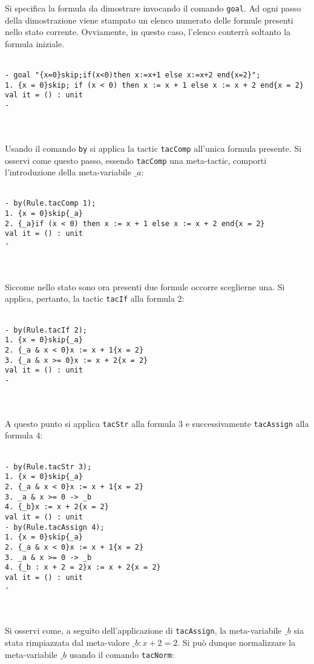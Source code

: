 \documentclass[]{article}
\begin{document}
Si specifica la formula da dimostrare invocando il comando \texttt{goal}. Ad ogni passo della dimostrazione viene stampato un elenco numerato delle formule presenti nello stato corrente. Ovviamente, in questo caso, l'elenco conterr\`a soltanto la formula iniziale.
\\
\\
\begin{BVerbatim}
- goal "{x=0}skip;if(x<0)then x:=x+1 else x:=x+2 end{x=2}";
1. {x = 0}skip; if (x < 0) then x := x + 1 else x := x + 2 end{x = 2}
val it = () : unit
- 
\end{BVerbatim}
\\
\\
Usando il comando \texttt{by} si applica la tactic \texttt{tacComp} all'unica formula presente. Si osservi come questo passo, essendo \texttt{tacComp} una meta-tactic, comporti l'introduzione della meta-variabile $\_a$:
\\
\\
\begin{BVerbatim}
- by(Rule.tacComp 1);
1. {x = 0}skip{_a}
2. {_a}if (x < 0) then x := x + 1 else x := x + 2 end{x = 2}
val it = () : unit
- 
\end{BVerbatim}
\\
\\
Siccome nello stato sono ora presenti due formule occorre sceglierne una. Si applica, pertanto, la tactic \texttt{tacIf} alla formula 2:
\\
\\
\begin{BVerbatim}
- by(Rule.tacIf 2);
1. {x = 0}skip{_a}
2. {_a & x < 0}x := x + 1{x = 2}
3. {_a & x >= 0}x := x + 2{x = 2}
val it = () : unit
- 
\end{BVerbatim}
\\
\\
A questo punto si applica \texttt{tacStr} alla formula 3 e successivamente \texttt{tacAssign} alla formula 4:
\\
\\
\begin{BVerbatim}
- by(Rule.tacStr 3);
1. {x = 0}skip{_a}
2. {_a & x < 0}x := x + 1{x = 2}
3. _a & x >= 0 -> _b
4. {_b}x := x + 2{x = 2}
val it = () : unit
- by(Rule.tacAssign 4);
1. {x = 0}skip{_a}
2. {_a & x < 0}x := x + 1{x = 2}
3. _a & x >= 0 -> _b
4. {_b : x + 2 = 2}x := x + 2{x = 2}
val it = () : unit
- 
\end{BVerbatim}
\\
\\
Si osservi come, a seguito dell'applicazione di \texttt{tacAssign}, la meta-variabile $\_b$ sia stata rimpiazzata dal meta-valore $\_b : x + 2 = 2$. Si pu\`o dunque normalizzare la meta-variabile $\_b$ usando il comando \texttt{tacNorm}:
\end{document}
